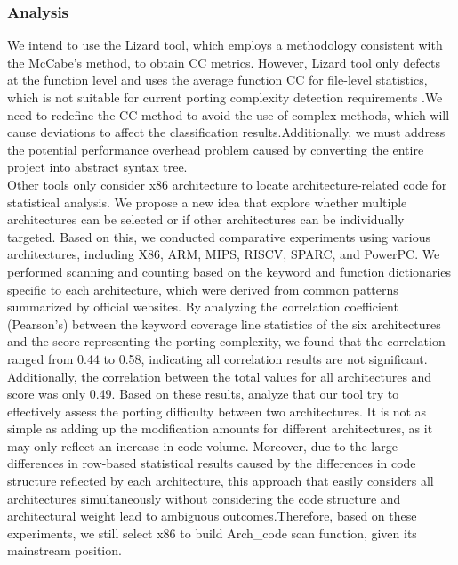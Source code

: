 \documentclass[sigconf,screen,review,anonymous]{acmart}
\begin{document}
\subsubsection{Analysis}
We intend to use the Lizard tool, which employs a methodology consistent with the McCabe's method\cite{1702388}, to obtain CC metrics.
However, Lizard tool only defects at the function level and uses the average function CC for file-level statistics, which is not suitable for current porting complexity detection requirements \cite{9402593}.We need to redefine the CC method to avoid the use of complex methods, which will cause deviations to affect the classification results.Additionally, we must address the potential performance overhead problem caused by converting the entire project into abstract syntax tree.\\
Other tools only consider x86 architecture to locate architecture-related code for statistical analysis. We propose a new idea that explore whether multiple architectures can be selected or if other architectures can be individually targeted. Based on this, we conducted comparative experiments using various architectures, including X86, ARM, MIPS, RISCV, SPARC, and PowerPC. We performed scanning and counting based on the keyword and function dictionaries specific to each architecture, which were derived from common patterns summarized by official websites.
By analyzing the correlation coefficient (Pearson's) between the keyword coverage line statistics of the six architectures and the score representing the porting complexity, we found that the correlation ranged from 0.44 to 0.58, indicating all correlation results are not significant. Additionally, the correlation between the total values for all architectures and score was only 0.49.
Based on these results, analyze that our tool try to effectively assess the porting difficulty between two architectures. It is not as simple as adding up the modification amounts for different architectures, as it may only reflect an increase in code volume. Moreover, due to the large differences in row-based statistical results caused by the differences in code structure reflected by each architecture, this approach that easily considers all architectures simultaneously without considering the code structure and architectural weight lead to ambiguous outcomes.Therefore, based on these experiments, we still select x86 to build Arch\_code scan function, given its mainstream position.
\end{document}
